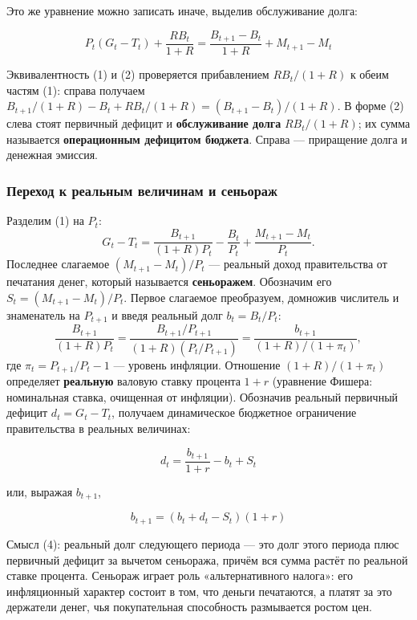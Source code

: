 \documentclass[11pt,a4paper]{article}
\begin{document}
Это же уравнение можно записать иначе, выделив обслуживание долга:
\begin{formulabox}
\begin{equation}
P_t(G_t-T_t)+\frac{RB_t}{1+R}=\frac{B_{t+1}-B_t}{1+R}+M_{t+1}-M_t \tag{2}
\end{equation}
\end{formulabox}
Эквивалентность (1) и (2) проверяется прибавлением $RB_t/(1+R)$ к обеим частям (1): справа получаем $B_{t+1}/(1+R)-B_t+RB_t/(1+R)=(B_{t+1}-B_t)/(1+R)$. В форме (2) слева стоят первичный дефицит и \textbf{обслуживание долга} $RB_t/(1+R)$; их сумма называется \textbf{операционным дефицитом бюджета}. Справа --- приращение долга и денежная эмиссия.

\subsubsection{Переход к реальным величинам и сеньораж}

Разделим (1) на $P_t$:
$$G_t-T_t=\frac{B_{t+1}}{(1+R)P_t}-\frac{B_t}{P_t}+\frac{M_{t+1}-M_t}{P_t}.$$
Последнее слагаемое $(M_{t+1}-M_t)/P_t$ --- реальный доход правительства от печатания денег, который называется \textbf{сеньоражем}. Обозначим его $S_t=(M_{t+1}-M_t)/P_t$. Первое слагаемое преобразуем, домножив числитель и знаменатель на $P_{t+1}$ и введя реальный долг $b_t=B_t/P_t$:
$$\frac{B_{t+1}}{(1+R)P_t}=\frac{B_{t+1}/P_{t+1}}{(1+R)(P_t/P_{t+1})}=\frac{b_{t+1}}{(1+R)/(1+\pi_t)},$$
где $\pi_t=P_{t+1}/P_t-1$ --- уровень инфляции. Отношение $(1+R)/(1+\pi_t)$ определяет \textbf{реальную} валовую ставку процента $1+r$ (уравнение Фишера: номинальная ставка, очищенная от инфляции). Обозначив реальный первичный дефицит $d_t=G_t-T_t$, получаем динамическое бюджетное ограничение правительства в реальных величинах:
\begin{formulabox}
\begin{equation}
d_t=\frac{b_{t+1}}{1+r}-b_t+S_t \tag{3}
\end{equation}
\end{formulabox}
или, выражая $b_{t+1}$,
\begin{formulabox}
\begin{equation}
b_{t+1}=(b_t+d_t-S_t)(1+r) \tag{4}
\end{equation}
\end{formulabox}
Смысл (4): реальный долг следующего периода --- это долг этого периода плюс первичный дефицит за вычетом сеньоража, причём вся сумма растёт по реальной ставке процента. Сеньораж играет роль «альтернативного налога»: его инфляционный характер состоит в том, что деньги печатаются, а платят за это держатели денег, чья покупательная способность размывается ростом цен.
\end{document}
